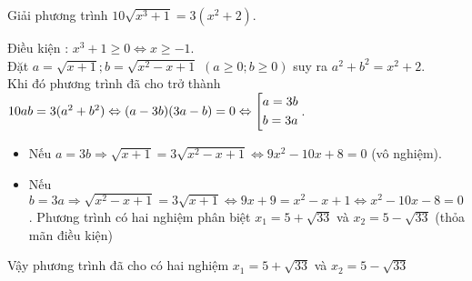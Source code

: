 \begin{ex}%
    Giải phương trình $10\sqrt{x^3 +1} = 3\left(x^2 +2\right)$.
\loigiai
    {
    Điều kiện : $x^3+1\geq 0\Leftrightarrow x\geq -1$.\\
    Đặt $a=\sqrt{x+1};b=\sqrt{x^2-x+1}$ $(a\geq 0;b\geq 0)$ suy ra $a^2+b^2=x^2+2$.\\
    Khi đó phương trình đã cho trở thành $10ab=3(a^2+b^2)\Leftrightarrow (a-3b)(3a-b)=0\Leftrightarrow \left[\begin{aligned}a=3b\\b=3a\end{aligned}\right.$.\\
    \begin{itemize}
    	\item Nếu $a=3b\Rightarrow \sqrt{x+1}=3\sqrt{x^2-x+1}\Leftrightarrow 9x^2-10x+8=0$ (vô nghiệm).
    	\item Nếu $b=3a\Rightarrow \sqrt{x^2-x+1}=3\sqrt{x+1}\Leftrightarrow 9x+9=x^2-x+1\Leftrightarrow x^2-10x-8=0$. Phương trình có hai nghiệm phân biệt $x_1=5+\sqrt{33}$ và $x_2=5-\sqrt{33}$ (thỏa mãn điều kiện)
    \end{itemize}
Vậy phương trình đã cho có hai nghiệm $x_1=5+\sqrt{33}$ và $x_2=5-\sqrt{33}$
    }
\end{ex}

